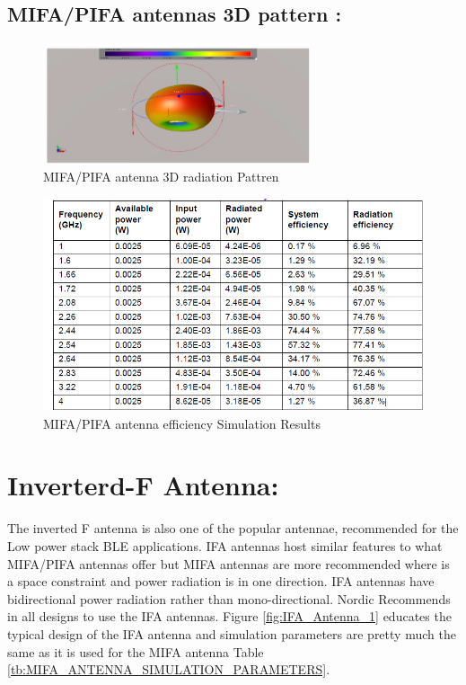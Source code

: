 \subsection{MIFA/PIFA antennas 3D pattern :}
\begin{figure}[h]
	\centering
	\includegraphics[width=0.7\textwidth]{Chap03/Figures/mifa_antenna_3d.PNG}
	\caption{MIFA/PIFA antenna 3D radiation Pattren}
	\label{fig:MIFA_3D}
\end{figure}

\begin{figure}[h]
	\centering
	\includegraphics[width=1\textwidth]{Chap03/Figures/mifa_antenna_effieciency.PNG}
	\caption{MIFA/PIFA antenna efficiency Simulation Results}
	\label{fig:MIFA_antenna_effieciency}
\end{figure}

\section{Inverterd-F Antenna:}
The inverted F antenna is also one of the popular antennae, recommended for the Low power stack BLE applications. IFA antennas host similar features to what MIFA/PIFA antennas offer but MIFA antennas are more recommended where is a space constraint and power radiation is in one direction. IFA antennas have bidirectional power radiation rather than mono-directional. Nordic Recommends in all designs to use the IFA antennas. Figure \ref{fig:IFA_Antenna_1} educates the typical design of the IFA antenna and simulation parameters are pretty much the same as it is used for the MIFA antenna Table \ref{tb:MIFA_ANTENNA_SIMULATION_PARAMETERS}.

